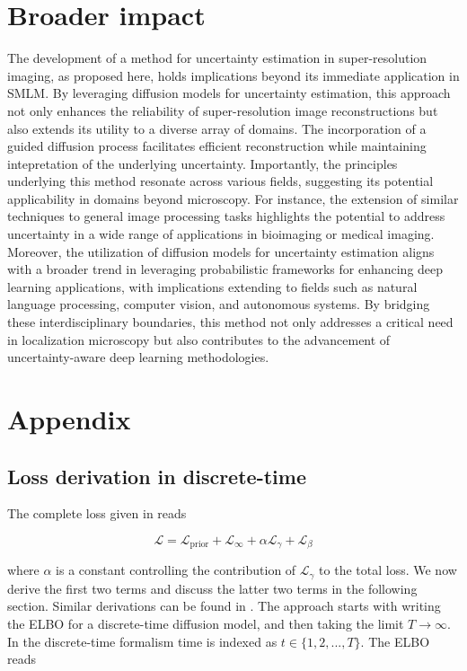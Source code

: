 \section{Broader impact}

The development of a method for uncertainty estimation in super-resolution imaging, as proposed here, holds implications beyond its immediate application in SMLM. By leveraging diffusion models for uncertainty estimation, this approach not only enhances the reliability of super-resolution image reconstructions but also extends its utility to a diverse array of domains. The incorporation of a guided diffusion process facilitates efficient reconstruction while maintaining intepretation of the underlying uncertainty. Importantly, the principles underlying this method resonate across various fields, suggesting its potential applicability in domains beyond microscopy. For instance, the extension of similar techniques to general image processing tasks highlights the potential to address uncertainty in a wide range of applications in bioimaging or medical imaging. Moreover, the utilization of diffusion models for uncertainty estimation aligns with a broader trend in leveraging probabilistic frameworks for enhancing deep learning applications, with implications extending to fields such as natural language processing, computer vision, and autonomous systems. By bridging these interdisciplinary boundaries, this method not only addresses a critical need in localization microscopy but also contributes to the advancement of uncertainty-aware deep learning methodologies.


\section{Appendix}

\subsection{Loss derivation in discrete-time}

The complete loss given in \parencite{Maggiora2023} reads

\begin{equation}
\mathcal{L} = \mathcal{L}_{\mathrm{prior}} + \mathcal{L}_{\infty} + \alpha\mathcal{L}_{\gamma} + \mathcal{L}_{\beta}
\end{equation}

where $\alpha$ is a constant controlling the contribution of $\mathcal{L}_{\gamma}$ to the total loss. We now derive the first two terms and discuss the latter two terms in the following section. Similar derivations can be found in \parencite{Maggiora2023,Kingma2021,Ribeiro2024}. The approach starts with writing the ELBO for a discrete-time diffusion model, and then taking the limit $T\rightarrow \infty$. In the discrete-time formalism time is indexed as $t\in \{1,2,...,T\}$. The ELBO reads

